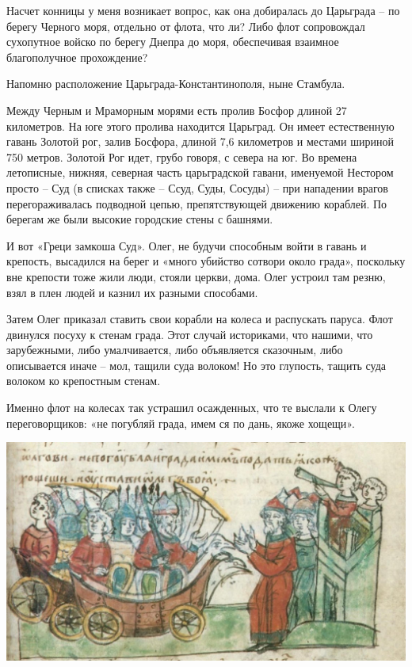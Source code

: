 Насчет конницы у меня возникает вопрос, как она добиралась до Царьграда – по берегу Черного моря, отдельно от флота, что ли? Либо флот сопровождал сухопутное войско по берегу Днепра до моря, обеспечивая взаимное благополучное прохождение?

Напомню расположение Царьграда-Константинополя, ныне Стамбула. 

Между Черным и Мраморным морями есть пролив Босфор длиной 27 километров. На юге этого пролива находится Царьград. Он имеет естественную гавань Золотой рог, залив Босфора, длиной 7,6 километров и местами шириной 750 метров. Золотой Рог идет, грубо говоря, с севера на юг. Во времена летописные, нижняя, северная часть царьградской гавани, именуемой Нестором просто – Суд (в списках также – Ссуд, Суды, Сосуды) – при нападении врагов перегораживалась подводной цепью, препятствующей движению кораблей. По берегам же были высокие городские стены с башнями.

И вот «Греци замкоша Суд». Олег, не будучи способным войти в гавань и крепость, высадился на берег и «много убийство сотвори около града», поскольку вне крепости тоже жили люди, стояли церкви, дома. Олег устроил там резню, взял в плен людей и казнил их разными способами.

Затем Олег приказал ставить свои корабли на колеса и распускать паруса. Флот двинулся посуху к стенам града. Этот случай историками, что нашими, что зарубежными, либо умалчивается, либо объявляется сказочным, либо описывается иначе – мол, тащили суда волоком! Но это глупость, тащить суда волоком ко крепостным стенам.

Именно флот на колесах так устрашил осажденных, что те выслали к Олегу переговорщиков: «не погубляй града, имем ся по дань, якоже хощещи».

\begin{center}
\includegraphics[width=\linewidth]{chast-volga/olg/kolesa.jpg}
\end{center}

